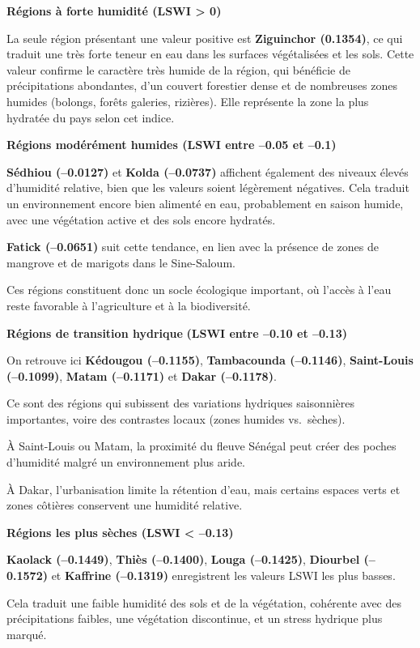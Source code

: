 \documentclass[
]{book}
\begin{document}
\textbf{Régions à forte humidité (LSWI \textgreater{} 0)}

La seule région présentant une valeur positive est \textbf{Ziguinchor (0.1354)}, ce qui traduit une très forte teneur en eau dans les surfaces végétalisées et les sols. Cette valeur confirme le caractère très humide de la région, qui bénéficie de précipitations abondantes, d'un couvert forestier dense et de nombreuses zones humides (bolongs, forêts galeries, rizières). Elle représente la zone la plus hydratée du pays selon cet indice.

\textbf{Régions modérément humides (LSWI entre --0.05 et --0.1)}

\textbf{Sédhiou (--0.0127)} et \textbf{Kolda (--0.0737)} affichent également des niveaux élevés d'humidité relative, bien que les valeurs soient légèrement négatives. Cela traduit un environnement encore bien alimenté en eau, probablement en saison humide, avec une végétation active et des sols encore hydratés.

\textbf{Fatick (--0.0651)} suit cette tendance, en lien avec la présence de zones de mangrove et de marigots dans le Sine-Saloum.

Ces régions constituent donc un socle écologique important, où l'accès à l'eau reste favorable à l'agriculture et à la biodiversité.

\textbf{Régions de transition hydrique} \textbf{(LSWI entre --0.10 et --0.13)}

On retrouve ici \textbf{Kédougou (--0.1155)}, \textbf{Tambacounda (--0.1146)}, \textbf{Saint-Louis (--0.1099)}, \textbf{Matam (--0.1171)} et \textbf{Dakar (--0.1178)}.

Ce sont des régions qui subissent des variations hydriques saisonnières importantes, voire des contrastes locaux (zones humides vs.~sèches).

À Saint-Louis ou Matam, la proximité du fleuve Sénégal peut créer des poches d'humidité malgré un environnement plus aride.

À Dakar, l'urbanisation limite la rétention d'eau, mais certains espaces verts et zones côtières conservent une humidité relative.

\textbf{Régions les plus sèches (LSWI \textless{} --0.13)}

\textbf{Kaolack (--0.1449)}, \textbf{Thiès (--0.1400)}, \textbf{Louga (--0.1425)}, \textbf{Diourbel (--0.1572)} et \textbf{Kaffrine (--0.1319)} enregistrent les valeurs LSWI les plus basses.

Cela traduit une faible humidité des sols et de la végétation, cohérente avec des précipitations faibles, une végétation discontinue, et un stress hydrique plus marqué.
\end{document}
